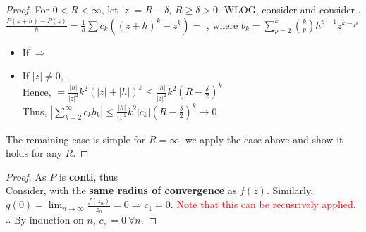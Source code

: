 \documentclass[12pt,a4paper]{article}
\begin{document}
\begin{proof}
  For $0 < R < \infty$, let $|z| = R - \delta$, $R \geq \delta > 0$. WLOG, consider  and consider . \\

  \vspace{1.0em}\noindent $\frac{P(z + h) - P(z)}{h} = \frac{1}{h} \sum c_k((z + h)^k - z^k) =$ , where $b_k = \sum_{p = 2}^k {k \choose p} h^{p - 1} z^{k - p}$ \\

  \begin{itemize}
    \item If  $\Rightarrow$ 
    \item If $|z| \neq 0$, . \\
    
    Hence,  $= \frac{|h|}{|z|^2} k^2 (|z| + |h|)^k \leq \frac{|h|}{|z|^2} k^2 (R - \frac{\delta}{2})^k$ \\

    Thus, $|\sum_{k = 2}^\infty c_k b_k| \leq \frac{|h|}{|z|^2} k^2 |c_k| (R - \frac{\delta}{2})^k \to 0$
  \end{itemize}

  \noindent The remaining case is simple for $R = \infty$, we apply the case above and show it holds for any $R$.
\end{proof}




\begin{proof}
  As $P$ is \textbf{conti}, thus  \\

  \noindent Consider,  with the \textbf{same radius of convergence} as $f(z)$. Similarly, $g(0) = \lim_{n \to \infty} \frac{f(z_n)}{z_n} = 0 \Rightarrow c_1 = 0$. {\textcolor{red}{Note that this can be recusrively applied.}} \\

  \noindent $\therefore$ By induction on $n$, $c_n = 0\ \forall n$.
\end{proof}
\end{document}
